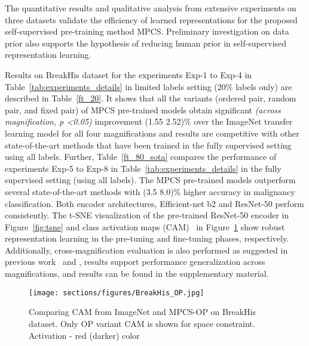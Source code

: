 \documentclass[conference]{IEEEtran}
\begin{document}
The quantitative results and qualitative analysis from extensive experiments on three datasets validate the efficiency of learned representations for the proposed self-supervised pre-training method MPCS. Preliminary investigation on data prior also supports the hypothesis of reducing human prior in self-supervised representation learning.

Results on BreakHis dataset for the experiments Exp-1 to Exp-4 in Table~\ref{tab:experiments_details}  in limited labels setting (20\% labels only) are described in Table~\ref{ft_20}. It shows that all the variants (ordered pair, random pair, and fixed pair) of MPCS pre-trained models obtain significant \textit{(across magnification, p \textless 0.05)} improvement (1.55  2.52)\% over the ImageNet transfer learning model for all four magnifications and results are competitive with other state-of-the-art methods that have been trained in the fully supervised setting using all labels. Further, Table~\ref{ft_80_sota} compares the performance of experiments Exp-5 to Exp-8 in Table~\ref{tab:experiments_details} in the fully supervised setting (using all labels). The MPCS pre-trained models outperform several state-of-the-art methods with (3.5  8.0)\% higher accuracy in malignancy classification. Both encoder architectures, Efficient-net b2 and ResNet-50 perform consistently. The t-SNE visualization of the pre-trained ResNet-50 encoder in Figure~\ref{fig:tsne} and class activation maps (CAM)~\cite{selvaraju2017grad} in Figure~\ref{fig:cam_breakhis} show robust representation learning in the pre-tuning and fine-tuning phases, respectively. Additionally, cross-magnification evaluation is also performed as suggested in previous work~\cite{gupta2017breast} and \cite{sikaroudi2021magnification}, results support performance generalization across magnifications, and results can be found in the supplementary material.
\begin{figure}[!ht]
    \centering
    \texttt{[image: sections/figures/BreakHis\_OP.jpg]}
    \caption{Comparing CAM from ImageNet and MPCS-OP on BreakHis dataset. Only OP variant CAM is shown for space constraint. Activation - red (darker) color}
    \label{fig:cam_breakhis}
    \vspace{-6mm}
\end{figure}
\end{document}
